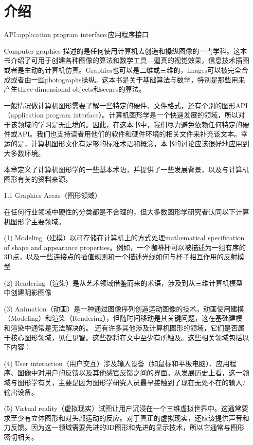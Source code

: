

\chapter{介绍}
\label{chap01}

API:application program interface:应用程序接口

Computer graphics 描述的是任何使用计算机去创造和操纵图像的一门学科。这本书介绍了可用于创建各种图像的算法和数学工具—逼真的视觉效果，信息技术插图或者是生动的计算机仿真。Graphics也可以是二维或三维的，images可以被完全合成或者由一些photographs操纵。这本书是关于基础算法与数学，特别是那些用来产生three-dimensional objects和scenes的算法。

一般情况做计算机图形需要了解一些特定的硬件、文件格式，还有个别的图形API（application program interface）。计算机图形学是一个快速发展的领域，所以对于该领域的学习是无止境的。因此，在这本书中，我们尽力避免依赖任何特定的硬件或API。我们也支持读者用他们的软件和硬件环境的相关文件来补充该文本。幸运的是，计算机图形文化有足够的标准术语和概念，本书的讨论应该很好地应用到大多数环境。

本章定义了计算机图形学的一些基本术语，并提供了一些发展背景，以及与计算机图形有关的资料来源。

1.1 Graphics Areas（图形领域）

在任何行业领域中硬性的分类都是不合理的，但大多数图形学研究者认同以下计算机图形学主要领域。

(1) Modeling（建模）以可存储在计算机上的方式处理mathematical specification of shape and appearance properties。例如，一个咖啡杯可以被描述为一组有序的3D点，以及一些连接点的插值规则和一个描述光线如何与杯子相互作用的反射模型

(2) Rendering（渲染）是从艺术领域借鉴而来的术语，涉及到从三维计算机模型中创建阴影图像

(3) Animation（动画）是一种通过图像序列创造运动图像的技术。动画使用建模（Modeling）和渲染（Rendering），但随时间移动是其关键问题，这在基础建模和渲染中通常是无法解决的。
还有许多其他涉及计算机图形的领域，它们是否属于核心图形领域，见仁见智。这些都将在文中至少有所触及。这些相关领域包括以下内容：

(4) User interaction（用户交互）涉及输入设备（如鼠标和平板电脑）、应用程序、图像中对用户的反馈以及其他感官反馈之间的界面。从发展历史上看，这一领域与图形学有关，主要是因为图形学研究人员最早接触到了现在无处不在的输入/输出设备。

(5) Virtual reality（虚拟现实）试图让用户沉浸在一个三维虚拟世界中。这通常要求至少有立体图形和对头部运动的反应。对于真正的虚拟现实，还应该提供声音和力反馈。因为这一领域需要先进的3D图形和先进的显示技术，所以它通常与图形密切相关。

